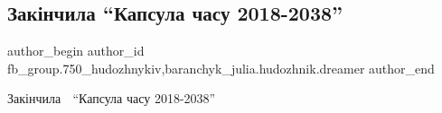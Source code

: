  
 
 
 
 

\subsection{Закінчила \enquote{Капсула часу 2018-2038}}
\label{sec:30_03_2018.fb.fb_group.750_hudozhnykiv.1.zakinchyla_kapsulu_chasu}
 
\ifcmt
 author_begin
   author_id fb_group.750_hudozhnykiv,baranchyk_julia.hudozhnik.dreamer
 author_end
\fi

{\large Закінчила 🙂 \enquote{Капсула часу 2018-2038}}

